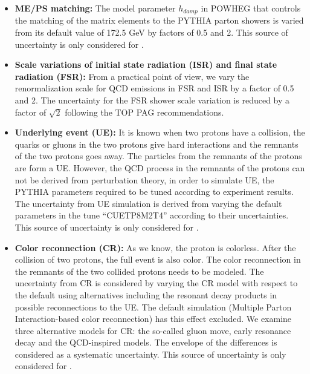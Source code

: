 \begin{itemize}
  \item \textbf{ME/PS matching:} The model parameter $h_{damp}$ in
POWHEG that controls the matching of the matrix elements to the PYTHIA parton showers is varied from its default value of 172.5 GeV
by factors of 0.5 and 2. This source of uncertainty is only considered for \ttbar.
  \item \textbf{Scale variations of initial state radiation (ISR) and final state radiation (FSR):} From a practical point of view, we vary the renormalization scale for QCD emissions in FSR and ISR by a factor of 0.5 and 2. The uncertainty for the FSR shower scale variation is reduced by a factor of $\sqrt{2}$ following the TOP PAG recommendations.
  \item \textbf{Underlying event (UE):} It is known when two protons have a collision, the quarks or gluons in the two protons give hard interactions and the remnants of the two protons goes away. The particles from the remnants of the protons are form a UE. However, the QCD process in the remnants of the protons can not be derived from perturbation theory, in order to simulate UE, the PYTHIA parameters required to be tuned according to experiment results. The uncertainty from UE simulation is derived from varying the default parameters in the tune ``CUETP8M2T4'' according to their uncertainties. This source of uncertainty is only considered for \ttbar.
  \item \textbf{Color reconnection (CR):} As we know, the proton is colorless. After the collision of two protons, the full event is also color. The color reconnection in the remnants of the two collided protons needs to be modeled. The uncertainty from CR is considered by varying the CR model with respect to the default using alternatives including the resonant decay products in possible reconnections to the UE. The default simulation (Multiple Parton Interaction-based color reconnection) has this effect excluded. We examine three alternative models for CR: the so-called gluon move, early resonance decay and the QCD-inspired models. The envelope of the differences is considered as a systematic uncertainty. This source of uncertainty is only considered for \ttbar.
\end{itemize}

